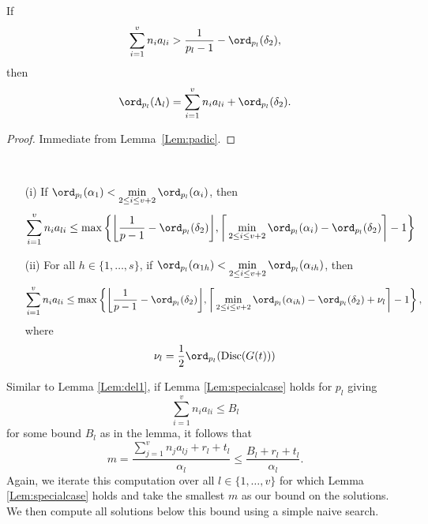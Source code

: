 {\begin{lemma} \label{Lem:Lambda}
If 
\[\sum_{i = 1}^v n_{i}a_{li} > \frac{1}{p_l-1} - \ord_{p_l}(\delta_2),\]
then
\[\ord_{p_l}(\Lambda_l) = \sum_{i = 1}^v n_{i}a_{li} + \ord_{p_l}(\delta_2).\]
\end{lemma}

\begin{proof}
Immediate from Lemma~\ref{Lem:padic}.
\end{proof}

\begin{lemma} \label{Lem:specialcase} \
\begin{enumerate}
\item[(i)] If $\ord_{p_l}(\alpha_1) < \displaystyle \min_{2 \leq i \leq v+2} \ord_{p_l}(\alpha_i)$, then
\[\sum_{i = 1}^v n_i a_{li} \leq \max \left\{ \bigg\lfloor{\frac{1}{p-1} - \ord_{p_l}(\delta_2)}\bigg\rfloor,  \bigg \lceil\displaystyle \min_{2 \leq i \leq v+2} \ord_{p_l}(\alpha_{i}) - \ord_{p_l}(\delta_2) \bigg \rceil - 1 \right\}\]

\item[(ii)] For all $h \in \{1, \dots, s\}$, if $\ord_{p_l}(\alpha_{1h}) < \displaystyle \min_{2 \leq i \leq v+2} \ord_{p_l}(\alpha_{ih})$, then
\[\sum_{i = 1}^v n_i a_{li} \leq \max \left\{ \bigg\lfloor{\frac{1}{p-1} - \ord_{p_l}(\delta_2)}\bigg\rfloor, \bigg \lceil \displaystyle \min_{2 \leq i \leq v+2} \ord_{p_l}(\alpha_{ih})- \ord_{p_l}(\delta_2) + \nu_l \bigg \rceil - 1\right\},\]
where 
\[\nu_l = \frac{1}{2}\ord_{p_l}(\text{Disc}(G(t)))\]
\end{enumerate}
\end{lemma}

Similar to Lemma \ref{Lem:del1}, if Lemma \ref{Lem:specialcase} holds for $p_l$ giving
\[\sum_{i = 1}^v n_i a_{li} \leq B_l\]
for some bound $B_l$ as in the lemma, it follows that
\[m = \frac{\sum_{j = 1}^{v}n_ja_{lj} + r_l + t_l}{\alpha_l} \leq \frac{B_l + r_l + t_l}{\alpha_l}. \]
Again, we iterate this computation over all $l \in \{1, \dots, v \}$ for which Lemma \ref{Lem:specialcase} holds and take the smallest $m$ as our bound on the solutions. We then compute all solutions below this bound using a simple naive search. 

}
